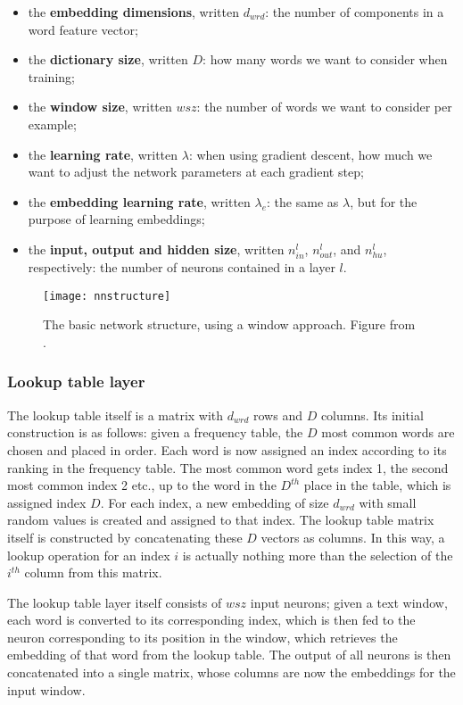 \begin{itemize}
\item the \textbf{embedding dimensions}, written $d_{wrd}$: the number of
  components in a word feature vector;
\item the \textbf{dictionary size}, written $D$: how many words we want to consider
  when training;
\item the \textbf{window size}, written $wsz$: the number of words we want to
  consider per example;
\item the \textbf{learning rate}, written $\lambda$: when using gradient descent,
  how much we want to adjust the network parameters at each gradient
  step;
\item the \textbf{embedding learning rate}, written $\lambda_{e}$: the same as
  $\lambda$, but for the purpose of learning embeddings;
\item the \textbf{input, output and hidden size}, written $n^l_{in}$, $n^l_{out}$, and $n^l_{hu}$, respectively: the number of neurons
  contained in a layer $l$.
\end{itemize}

\begin{figure}
\texttt{[image: nnstructure]}
\caption{The basic network structure, using a window approach. Figure from \citet[2499]{collobert-2011}.} \label{fig:nnstructure}
\end{figure}

\subsubsection{Lookup table layer}
The lookup table itself is a matrix with $d_{wrd}$ rows and $D$
columns. Its initial construction is as follows: given a frequency
table, the $D$ most common words are chosen and placed in order. Each
word is now assigned an index according to its ranking in the
frequency table. The most common word gets index 1, the second most
common index 2 etc., up to the word in the $D^{th}$ place in the
table, which is assigned index $D$. For each index, a new embedding of
size $d_{wrd}$ with small random values is created and assigned to
that index. The lookup table matrix itself is constructed by
concatenating these $D$ vectors as columns.  In this way, a lookup
operation for an index $i$ is actually nothing more than the selection
of the $i^{th}$ column from this matrix.

The lookup table layer itself consists of $wsz$ input neurons; given a
text window, each word is converted to its corresponding index, which
is then fed to the neuron corresponding to its position in the window,
which retrieves the embedding of that word from the lookup table. The
output of all neurons is then concatenated into a single matrix, whose
columns are now the embeddings for the input window. 

